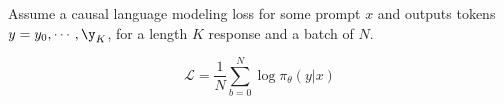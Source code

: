 







Assume a causal language modeling loss for some prompt $x$ and outputs tokens $y = y_0, \cdots, \y_K$, for a length $K$ response and a batch of $N$.

\begin{equation}
    \mathcal{L} = \frac{1}{N} \sum_{b=0}^N \log \pi_\theta (y | x) 
\end{equation}

